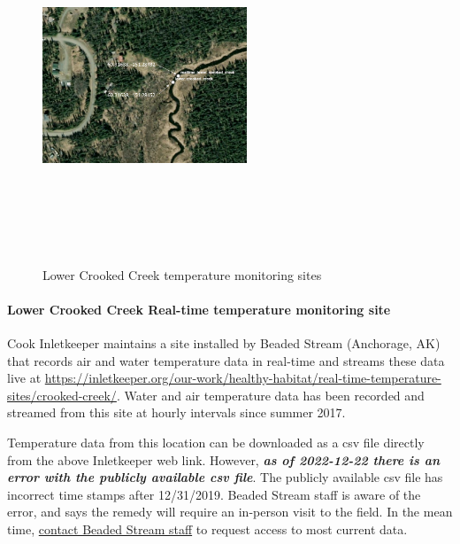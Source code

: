 \documentclass[
  letterpaper,
  DIV=11,
  numbers=noendperiod]{scrreprt}
\let\oldparagraph\paragraph
\renewcommand{\paragraph}[1]{\oldparagraph{#1}\mbox{}}
\begin{document}
\begin{figure}

{\centering \includegraphics[width=2.41in,height=4.16667in]{./images/lower_crooked_creek_temp_logger_map.png}

}

\caption{\label{fig-cc-map}Lower Crooked Creek temperature monitoring
sites}

\end{figure}

\hypertarget{lower-crooked-creek-real-time-temperature-monitoring-site}{%
\paragraph{Lower Crooked Creek Real-time temperature monitoring
site}\label{lower-crooked-creek-real-time-temperature-monitoring-site}}

Cook Inletkeeper maintains a site installed by Beaded Stream (Anchorage,
AK) that records air and water temperature data in real-time and streams
these data live at
\url{https://inletkeeper.org/our-work/healthy-habitat/real-time-temperature-sites/crooked-creek/}.
Water and air temperature data has been recorded and streamed from this
site at hourly intervals since summer 2017.

Temperature data from this location can be downloaded as a csv file
directly from the above Inletkeeper web link. However, \textbf{\emph{as
of 2022-12-22 there is an error with the publicly available csv file}}.
The publicly available csv file has incorrect time stamps after
12/31/2019. Beaded Stream staff is aware of the error, and says the
remedy will require an in-person visit to the field. In the mean time,
\href{http://www.beadedstream.com/contact/}{contact Beaded Stream staff}
to request access to most current data.
\end{document}
